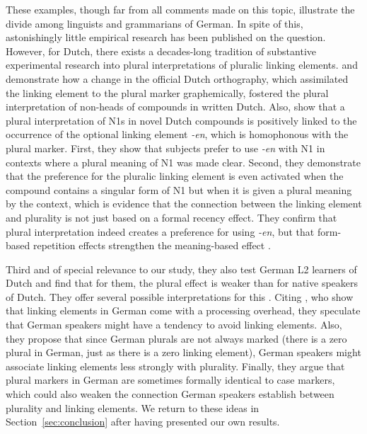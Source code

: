 These examples, though far from all comments made on this topic, illustrate the divide among linguists and grammarians of German.
In spite of this, astonishingly little empirical research has been published on the question.
However, for Dutch, there exists a decades-long tradition of substantive experimental research into plural interpretations of pluralic linking elements.
\textcite{SchreuderEa1998} and \textcite{BangaEa2012} demonstrate how a change in the official Dutch orthography, which assimilated the linking element to the plural marker graphemically, fostered the plural interpretation of non-heads of compounds in written Dutch.
Also, \textcite{BangaEa2013a} show that a plural interpretation of N1s in novel Dutch compounds is positively linked to the occurrence of the optional linking element \mbox{\textit{-en}}, which is homophonous with the plural marker.
First, they show that subjects prefer to use \textit{-en} with N1 in contexts where a plural meaning of N1 was made clear.
Second, they demonstrate that the preference for the pluralic linking element is even activated when the compound contains a singular form of N1 but when it is given a plural meaning by the context, which is evidence that the connection between the linking element and plurality is not just based on a formal recency effect.
They confirm that plural interpretation indeed creates a preference for using \textit{-en}, but that form-based repetition effects strengthen the meaning-based effect \parencite[45]{BangaEa2013a}.

Third and of special relevance to our study, they also test German L2 learners of Dutch and find that for them, the plural effect is weaker than for native speakers of Dutch.
They offer several possible interpretations for this \parencite[45--47]{BangaEa2013a}.
Citing \textcite{LibbenEa2002}, who show that linking elements in German come with a processing overhead, they speculate that German speakers might have a tendency to avoid linking elements.
Also, they propose that since German plurals are not always marked (there is a zero plural in German, just as there is a zero linking element), German speakers might associate linking elements less strongly with plurality.
Finally, they argue that plural markers in German are sometimes formally identical to case markers, which could also weaken the connection German speakers establish between plurality and linking elements.
We return to these ideas in Section~\ref{sec:conclusion} after having presented our own results.

